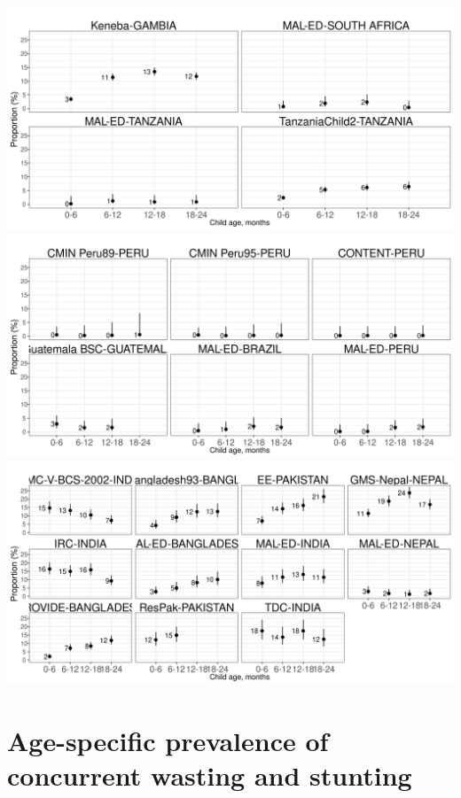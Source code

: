 \documentclass[
  9pt,
]{book}
\begin{document}
\includegraphics[width=41.67in]{figures//wasting/fig-perswast_plot_africa}
\includegraphics[width=41.67in]{figures//wasting/fig-perswast_plot_lam}
\includegraphics[width=41.67in]{figures//wasting/fig-perswast_plot_sasia}

\hypertarget{age-specific-prevalence-of-concurrent-wasting-and-stunting-1}{%
\section{Age-specific prevalence of concurrent wasting and stunting}\label{age-specific-prevalence-of-concurrent-wasting-and-stunting-1}}
\end{document}
